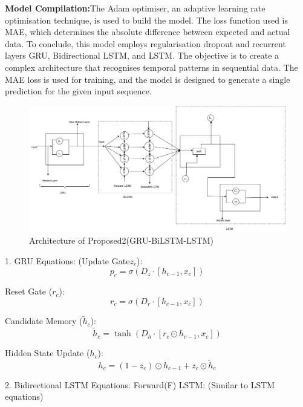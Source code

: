 \documentclass[a4paper,fleqn]{cas-sc}
\begin{document}
\textbf{Model Compilation:}The Adam optimiser, an adaptive learning rate optimisation technique, is used to build the model. The loss function used is MAE, which determines the absolute difference between expected and actual data. To conclude, this model employs regularisation dropout and recurrent layers GRU, Bidirectional LSTM, and LSTM. The objective is to create a complex architecture that recognises temporal patterns in sequential data. The MAE loss is used for training, and the model is designed to generate a single prediction for the given input sequence.



\begin{figure}[!ht]
\centering
\includegraphics[width=\textwidth]{GRU-BiLSTM-LSTM (1)}
\caption{Architecture of Proposed2(GRU-BiLSTM-LSTM)}
\label{}
\end{figure}




1. GRU Equations:
(Update Gate$z_c$):
\begin{equation}
p_c = \sigma(D_z \cdot [h_{c-1}, x_c])
\end{equation}

Reset Gate ($r_c$):
\begin{equation}
r_c = \sigma(D_r \cdot [h_{c-1}, x_c])
\end{equation}

Candidate Memory ($\tilde{h}_c$):
\begin{equation}
\tilde{h}_c = \tanh(D_h \cdot [r_c \odot h_{c-1}, x_c])
\end{equation}

Hidden State Update ($h_c$):
\begin{equation}
h_c = (1 - z_c) \odot h_{c-1} + z_c \odot \tilde{h}_c
\end{equation}

2. Bidirectional LSTM Equations:
Forward(F) LSTM:
(Similar to LSTM equations)
\end{document}
